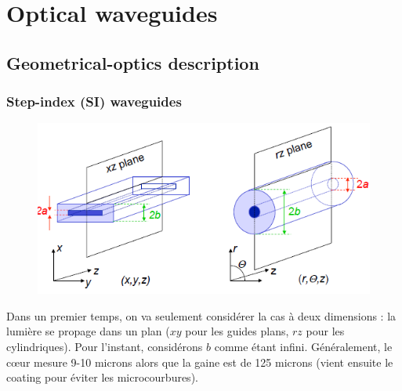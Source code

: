 \setcounter{chapter}{1}
\chapter{Optical waveguides}
\section{Geometrical-optics description}
\subsection{Step-index (SI) waveguides}
	\begin{figure}
	\vspace{-5mm}
	\includegraphics[scale=0.4]{ch1/image1.png}
	\end{figure}
Dans un premier temps, on va seulement considérer la cas à deux dimensions : 
la lumière se propage dans un plan ($xy$ pour les guides plans, $rz$ pour les cylindriques). 
Pour l'instant, considérons $b$ comme étant infini. Généralement, le cœur mesure 9-10 microns
alors que la gaine est de 125 microns (vient ensuite le coating pour éviter les microcourbures).\\

